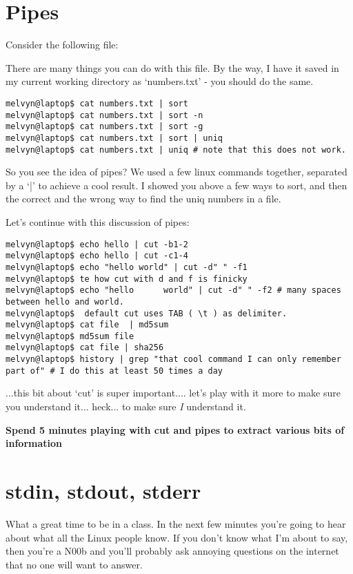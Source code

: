 \documentclass[10pt]{article}
\begin{document}
\section*{Pipes}
Consider the following file:



There are many things you can do with this file. By the way, I have it saved in
my current working directory as `numbers.txt' - you should do the same.

\begin{lstlisting}[style=term]
melvyn@laptop$ cat numbers.txt | sort
melvyn@laptop$ cat numbers.txt | sort -n
melvyn@laptop$ cat numbers.txt | sort -g
melvyn@laptop$ cat numbers.txt | sort | uniq
melvyn@laptop$ cat numbers.txt | uniq # note that this does not work.
\end{lstlisting}

So you see the idea of pipes? We used a few linux commands together, separated
by a `|' to achieve a cool result. I showed you above a few ways to sort, and
then the correct and the wrong way to find the uniq numbers in a file. 

Let's continue with this discussion of pipes:

\begin{lstlisting}[style=term]
melvyn@laptop$ echo hello | cut -b1-2
melvyn@laptop$ echo hello | cut -c1-4
melvyn@laptop$ echo "hello world" | cut -d" " -f1
melvyn@laptop$ te how cut with d and f is finicky
melvyn@laptop$ echo "hello      world" | cut -d" " -f2 # many spaces between hello and world.
melvyn@laptop$  default cut uses TAB ( \t ) as delimiter.
melvyn@laptop$ cat file  | md5sum
melvyn@laptop$ md5sum file
melvyn@laptop$ cat file | sha256
melvyn@laptop$ history | grep "that cool command I can only remember part of" # I do this at least 50 times a day
\end{lstlisting} 

...this bit about `cut' is super important.... let's play with it more to make
sure you understand it... heck... to make sure \textit{I} understand it.


\textbf{Spend 5 minutes playing with cut and pipes to extract various bits of
information}

\section*{stdin, stdout, stderr}

What a great time to be in a class. In the next few minutes you're going to hear
about what all the Linux people know. If you don't know what I'm about to say,
then you're a N00b and you'll probably ask annoying questions on the internet
that no one will want to answer.  
\end{document}
